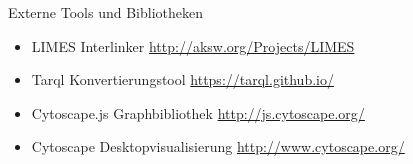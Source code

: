 \documentclass{beamer}
\begin{document}
\begin{frame}[fragile]{Externe Tools und Bibliotheken}
\begin{itemize}
\item LIMES Interlinker \url{http://aksw.org/Projects/LIMES}
\item Tarql Konvertierungstool \url{https://tarql.github.io/}
\item Cytoscape.js Graphbibliothek \url{http://js.cytoscape.org/}
\item Cytoscape Desktopvisualisierung \url{http://www.cytoscape.org/}
\end{itemize}
\end{frame}
 
\end{document}
